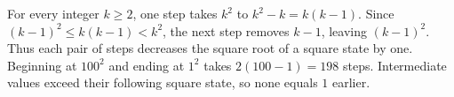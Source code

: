 For every integer $k\ge2$, one step takes $k^2$ to $k^2-k=k(k-1)$. Since $(k-1)^2\le k(k-1)<k^2$, the next step removes $k-1$, leaving $(k-1)^2$. Thus each pair of steps decreases the square root of a square state by one. Beginning at $100^2$ and ending at $1^2$ takes $2(100-1)=\boxed{198}$ steps. Intermediate values exceed their following square state, so none equals $1$ earlier.
